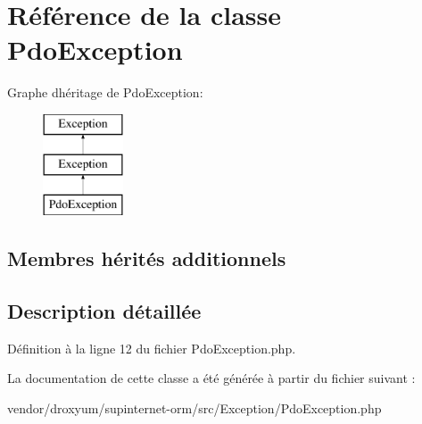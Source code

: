 \hypertarget{class_o_r_m_1_1_exception_1_1_pdo_exception}{}\section{Référence de la classe Pdo\+Exception}
\label{class_o_r_m_1_1_exception_1_1_pdo_exception}
Graphe d\textquotesingle{}héritage de Pdo\+Exception\+:\begin{figure}[H]
\begin{center}
\leavevmode
\includegraphics[height=3.000000cm]{class_o_r_m_1_1_exception_1_1_pdo_exception}
\end{center}
\end{figure}
\subsection*{Membres hérités additionnels}


\subsection{Description détaillée}


Définition à la ligne 12 du fichier Pdo\+Exception.\+php.



La documentation de cette classe a été générée à partir du fichier suivant \+:\begin{DoxyCompactItemize}
\item 
vendor/droxyum/supinternet-\/orm/src/\+Exception/Pdo\+Exception.\+php\end{DoxyCompactItemize}
